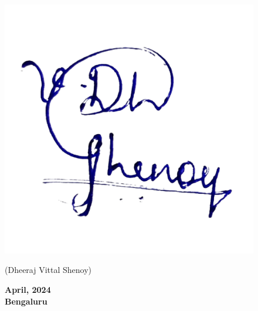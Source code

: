 \message{ !name(main.tex)}\documentclass[12pt]{article}
\def \auth {Dheeraj Vittal Shenoy}
\begin{document}
\noindent

\begin{figure}[h!]
    \flushleft
    \hspace{0.5cm}
    \includegraphics[scale=0.125]{images/sign.png}
    \begin{minipage}{0.5\textwidth}
        \flushleft
        (\auth)

    \end{minipage}%
    \begin{minipage}{0.5\textwidth}
        \flushright

        \textbf{April, 2024\\
          Bengaluru}
    \end{minipage}
\end{figure}

\restoregeometry


\end{document}
